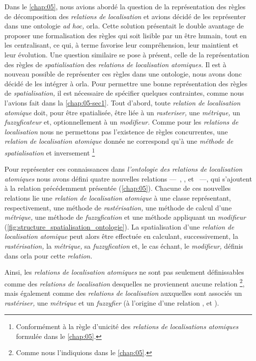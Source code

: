 Dans le \autoref{chap:05}, nous avions abordé la question de la
représentation des règles de décomposition des \emph{relations de
  localisation} et avions décidé de les représenter dans une ontologie
\emph{ad hoc,} \ac{orla}. Cette solution présentait le double avantage
de proposer une formalisation des règles qui soit lisible par un être
humain, tout en les centralisant, ce qui, à terme favorise leur
compréhension, leur maintient et leur évolution. Une question
similaire se pose à présent, celle de la représentation des règles de
\emph{spatialisation} des \emph{relations de localisation atomiques.}
Il est à nouveau possible de représenter ces règles dans une
ontologie, nous avons donc décidé de les intégrer à \ac{orla}. Pour
permettre une bonne représentation des règles de
\emph{spatialisation,} il est nécessaire de spécifier quelques
contraintes, comme nous l'avions fait dans la
\autoref{chap:05-sec1}. Tout d'abord, toute \emph{relation de
  localisation atomique} doit, pour être spatialisée, être liée à un
\emph{rasteriser,} une \emph{métrique,} un \emph{fuzzyficateur} et,
optionnellement à un \emph{modifieur.} Comme pour les \emph{relations
  de localisation} nous ne permettons pas l’existence de règles
concurrentes, une \emph{relation de localisation atomique} donnée
ne correspond qu'à une \emph{méthode de spatialisation} et inversement
\footnote{Conformément à la règle d'unicité des \emph{relations de
  localisations atomiques} formulée dans le \autoref{chap:05}.}

Pour représenter ces connaissances dans \emph{l'ontologie des relations de localisation atomiques} nous avons défini quatre nouvelles relations ---~, ,  et ~---, qui s'ajoutent à la relation  précédemment présentée (\autoref{chap:05}). Chacune de ces nouvelles relations lie une \emph{relation de localisation atomique} à une classe représentant, respectivement, une méthode de \emph{rastérisation,} une méthode de calcul d'une \emph{métrique,} une méthode de \emph{fuzzyfication} et une méthode appliquant un \emph{modifieur} (\autoref{fig:structure_spatialisation_ontologie}). La spatialisation d'une \emph{relation de localisation atomique} peut alors être effectuée en calculant, successivement, la \emph{rastérisation,} la \emph{métrique,} sa \emph{fuzzyfication} et, le cas échant, le \emph{modifieur,} définis dans \ac{orla} pour cette \emph{relation.}

Ainsi, les \emph{relations de localisation atomiques} ne sont pas seulement définissables comme des \emph{relations de localisation} desquelles ne proviennent aucune relation  \footnote{Comme nous l'indiquions dans le \autoref{chap:05}.}, mais également comme des \emph{relations de localisation} auxquelles sont associés un \emph{rastériser,} une \emph{métrique} et un \emph{fuzzyfier} (\ie à l'origine d'une relation ,  et ).

